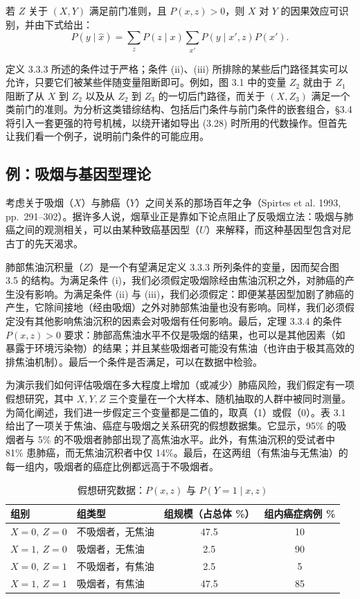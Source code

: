 \begin{theorem}[前门调整]
若 $Z$ 关于 $(X,Y)$ 满足前门准则，且 $P(x,z)>0$，则 $X$ 对 $Y$ 的因果效应可识别，并由下式给出：
\begin{equation}
P(y\mid\hat{x}) = \sum_{z}P(z\mid x)\sum_{x'}P(y\mid x',z)P(x'). \tag{3.29}
\end{equation}
\end{theorem}

定义 3.3.3 所述的条件过于严格；条件 (ii)、(iii) 所排除的某些后门路径其实可以允许，只要它们被某些伴随变量阻断即可。例如，图 3.1 中的变量 $Z_2$ 就由于 $Z_1$ 阻断了从 $X$ 到 $Z_2$ 以及从 $Z_2$ 到 $Z_3$ 的一切后门路径，而关于 $(X,Z_3)$ 满足一个类前门的准则。为分析这类错综结构、包括后门条件与前门条件的嵌套组合，\S 3.4 将引入一套更强的符号机械，以绕开诸如导出 \textup{(3.28)} 时所用的代数操作。但首先让我们看一个例子，说明前门条件的可能应用。

\subsection{例：吸烟与基因型理论}

考虑关于吸烟（$X$）与肺癌（$Y$）之间关系的那场百年之争（Spirtes et al. 1993, pp.~291--302）。据许多人说，烟草业正是靠如下论点阻止了反吸烟立法：吸烟与肺癌之间的观测相关，可以由某种致癌基因型（$U$）来解释，而这种基因型包含对尼古丁的先天渴求。

肺部焦油沉积量（$Z$）是一个有望满足定义 3.3.3 所列条件的变量，因而契合图 3.5 的结构。为满足条件 (i)，我们必须假定吸烟除经由焦油沉积之外，对肺癌的产生没有影响。为满足条件 (ii) 与 (iii)，我们必须假定：即便某基因型加剧了肺癌的产生，它除间接地（经由吸烟）之外对肺部焦油量也没有影响。同样，我们必须假定没有其他影响焦油沉积的因素会对吸烟有任何影响。最后，定理 3.3.4 的条件 $P(x,z)>0$ 要求：肺部高焦油水平不仅是吸烟的结果，也可以是其他因素（如暴露于环境污染物）的结果；并且某些吸烟者可能没有焦油（也许由于极其高效的排焦油机制）。最后一个条件是否满足，可以在数据中检验。

为演示我们如何评估吸烟在多大程度上增加（或减少）肺癌风险，我们假定有一项假想研究，其中 $X,Y,Z$ 三个变量在一个大样本、随机抽取的人群中被同时测量。为简化阐述，我们进一步假定三个变量都是二值的，取真（1）或假（0）。表 3.1 给出了一项关于焦油、癌症与吸烟之关系研究的假想数据集。它显示，95\% 的吸烟者与 5\% 的不吸烟者肺部出现了高焦油水平。此外，有焦油沉积的受试者中 81\% 患肺癌，而无焦油沉积者中仅 14\%。最后，在这两组（有焦油与无焦油）的每一组内，吸烟者的癌症比例都远高于不吸烟者。

\begin{table}[htbp]
\centering
\caption{假想研究数据：$P(x,z)$ 与 $P(Y=1\mid x,z)$}
\label{tab:3.1}
\small
\begin{tabular}{llcc}
\toprule
组别 & 组类型 & 组规模（占总体 \%） & 组内癌症病例 \% \\
\midrule
$X=0,\ Z=0$ & 不吸烟者，无焦油 & 47.5 & 10 \\
$X=1,\ Z=0$ & 吸烟者，无焦油   & 2.5  & 90 \\
$X=0,\ Z=1$ & 不吸烟者，有焦油 & 2.5  & 5  \\
$X=1,\ Z=1$ & 吸烟者，有焦油   & 47.5 & 85 \\
\bottomrule
\end{tabular}
\end{table}

